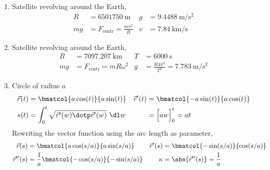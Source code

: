 \begin{enumerate}
    \item Satellite revolving around the Earth,
          \begin{align}
              R  & = \SI{6501750}{\m}                  &
              g  & = \SI{9.4488}{\m\per\s\squared}       \\
              mg & = F_{\text{centr}} = \frac{mv^2}{R} &
              v  & = \SI{7.84}{\km\per\s}
          \end{align}

    \item Satellite revolving around the Earth,
          \begin{align}
              R  & = \SI{7097.207}{\km}                                  &
              T  & = \SI{6000}{\s}                                         \\
              mg & = F_{\text{centr}} = mR\omega^2                       &
              g  & = \frac{R 4\pi^2}{T^2} = \SI{7.783}{\m\per\s\squared}
          \end{align}

    \item Circle of radius $ a $
          \begin{align}
              \vec{r}(t)  & = \bmatcol{a\cos(t)}{a\sin(t)}                      &
              \vec{r}'(t) & = \bmatcol{-a\sin(t)}{a\cos(t)}                       \\
              s(t)        & = \int_{0}^{t} \sqrt{\vec{r}'(w) \dotp \vec{r}'(w)}
              \ \dl w     &
                          & = \Big[ aw \Big]_0^t = at
          \end{align}
          Rewriting the vector function using the arc length as parameter,
          \begin{align}
              \vec{r}(s)   & = \bmatcol{a\cos(s/a)}{a\sin(s/a)}            &
              \vec{r}'(s)  & = \bmatcol{-\sin(s/a)}{\cos(s/a)}               \\
              \vec{r}''(s) & = \frac{1}{a}\bmatcol{-\cos(s/a)}{-\sin(s/a)} &
              \kappa       & = \abs{\vec{r}''(s)} = \frac{1}{a}
          \end{align}


\end{enumerate}
